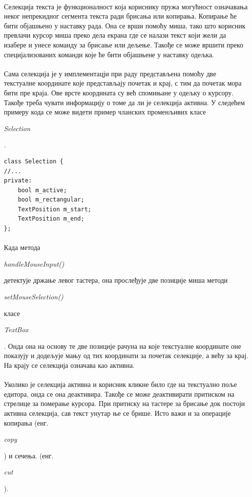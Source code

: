 \documentclass[12pt,oneside]{memoir}
\begin{document}
\paragraph{}
Селекција текста је функционалност која кориснику пружа могућност означавања
неког непрекидног сегмента текста ради брисања или копирања. Копирање ће бити
објашњено у наставку рада. Она се врши помоћу миша, тако што корисник превлачи
курсор миша преко дела екрана где се налази текст који жели да изабере и унесе
команду за брисање или дељење. Такође се може вршити преко специјализованих команди
које ће бити објашњене у наставку одељка.

\paragraph{}
Сама селекција је у имплементацји при раду представљена помоћу две текстуалне
координате које представљају почетак и крај, с тим да почетак мора бити пре краја.
Ове врсте координата су већ спомињане у одељку о курсору. Такође треба чувати информацију о томе да ли је селекција активна. У следећем примеру кода се може
видети пример чланских променљивих класе 
\begin{latinica}\textit{Selection}\end{latinica}.

\begin{verbatim}
class Selection {
//...
private:
	bool m_active;
	bool m_rectangular;
	TextPosition m_start;
	TextPosition m_end;
};
\end{verbatim}


\paragraph{}
Када метода \begin{latinica}\textit{handleMouseInput()}\end{latinica} детектује држање
левог тастера, она прослеђује две позиције миша методи \begin{latinica}\textit{setMouseSelection()}\end{latinica} класе
\begin{latinica}\textit{TextBox}\end{latinica}. Онда она на основу те две позиције
рачуна на које текстуалне координате оне показују и додељује мању од тих координати
за почетак селекције, а већу за крај. На крају се селекција означава као активна.

\paragraph{}
Уколико је селекција активна и корисник кликне било где на текстуално поље едитора,
онда се она деактивира. Такође се може деактивирати притиском на стрелице за померање
курсора. При притиску на тастере за брисање док постоји активна селекција, сав текст
унутар ње се брише. Исто важи и за операције копирања 
(енг. \begin{latinica}\textit{copy}\end{latinica}) и сечења.
(енг. \begin{latinica}\textit{cut}\end{latinica}).
\end{document}
